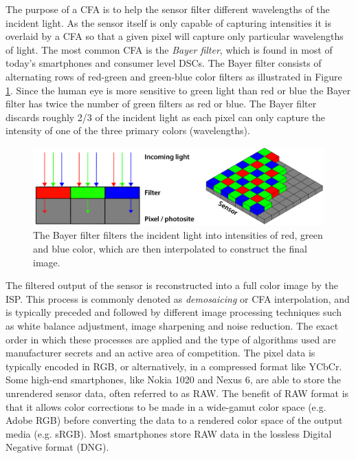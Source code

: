 \documentclass[thesis.tex]{subfiles}
\begin{document}
The purpose of a CFA is to help the sensor filter different wavelengths of the incident light. As the sensor itself is only capable of capturing intensities it is overlaid by a CFA so that a given pixel will capture only particular wavelengths of light. The most common CFA is the \textit{Bayer filter}, which is found in most of today's smartphones and consumer level DSCs. The Bayer filter consists of alternating rows of red-green and green-blue color filters as illustrated in Figure \ref{figure:bayer}. Since the human eye is more sensitive to green light than red or blue the Bayer filter has twice the number of green filters as red or blue. The Bayer filter discards roughly 2/3 of the incident light as each pixel can only capture the intensity of one of the three primary colors (wavelengths).

\begin{figure}[h]
\centering \includegraphics[width=\textwidth]{images/bayer}
\caption{The Bayer filter filters the incident light into intensities of red, green and blue color, which are then interpolated to construct the final image. \label{figure:bayer}}
\end{figure}

The filtered output of the sensor is reconstructed into a full color image by the ISP. This process is commonly denoted as \textit{demosaicing} or CFA interpolation, and is typically preceded and followed by different image processing techniques such as white balance adjustment, image sharpening and noise reduction. The exact order in which these processes are applied and the type of algorithms used are manufacturer secrets and an active area of competition. The pixel data is typically encoded in RGB, or alternatively, in a compressed format like YCbCr. Some high-end smartphones, like Nokia 1020 and Nexus 6, are able to store the unrendered sensor data, often referred to as RAW. The benefit of RAW format is that it allows color corrections to be made in a wide-gamut color space (e.g. Adobe RGB) before converting the data to a rendered color space of the output media (e.g. sRGB). Most smartphones store RAW data in the lossless Digital Negative format (DNG).
\end{document}
